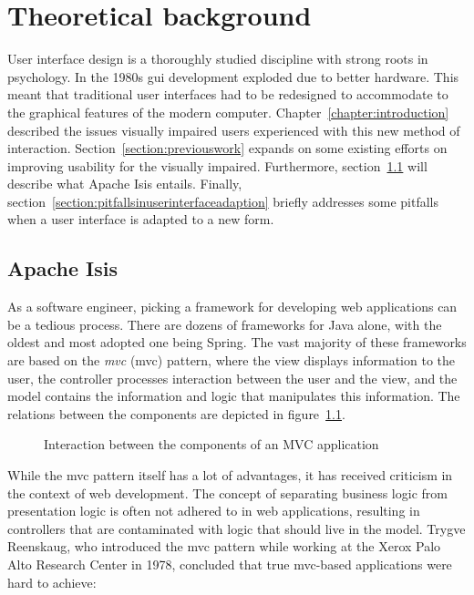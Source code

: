 \chapter{Theoretical background}
\label{chapter:theoreticalbackground}
User interface design is a thoroughly studied discipline with strong roots in psychology. In the 1980s \acrshort{gui} development exploded due to better hardware\cite{myers1998brief}. This meant that traditional user interfaces had to be redesigned to accommodate to the graphical features of the modern computer. Chapter~\ref{chapter:introduction} described the issues visually impaired users experienced with this new method of interaction. Section~\ref{section:previouswork} expands on some existing efforts on improving usability for the visually impaired. Furthermore, section~\ref{section:apacheisis} will describe what Apache Isis entails. Finally, section~\ref{section:pitfallsinuserinterfaceadaption} briefly addresses some pitfalls when a user interface is adapted to a new form.

\section{Apache Isis}
\label{section:apacheisis}
As a software engineer, picking a framework for developing web applications can be a tedious process. There are dozens of frameworks for Java alone, with the oldest and most adopted one being Spring\cite{Sprin96:online}. The vast majority of these frameworks are based on the \textit{\acrlong{mvc}} (\acrshort{mvc}) pattern, where the view displays information to the user, the controller processes interaction between the user and the view, and the model contains the information and logic that manipulates this information\cite{leff2001web}. The relations between the components are depicted in figure~\ref{figure:mvc}.

\begin{figure}[h]
	\center
	
	\caption{Interaction between the components of an MVC application}
	\label{figure:mvc}
\end{figure}

While the \acrshort{mvc} pattern itself has a lot of advantages, it has received criticism in the context of web development. The concept of separating business logic from presentation logic is often not adhered to in web applications, resulting in controllers that are contaminated with logic that should live in the model\cite{Fulfi2:online}. Trygve Reenskaug, who introduced the \acrshort{mvc} pattern while working at the Xerox Palo Alto Research Center in 1978, concluded that true \acrshort{mvc}-based applications were hard to achieve\cite{reenskaug2007programming}:

